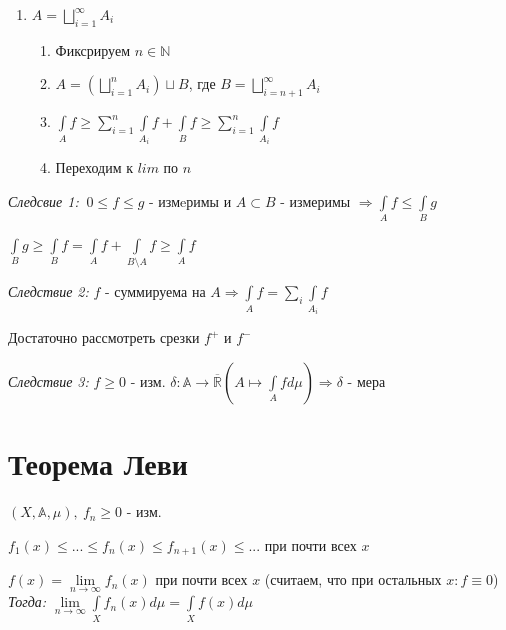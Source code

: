 \documentclass[paper=a4, fontsize=17pt]{article}
\begin{document}
\begin{enumerate}
\begin{enumerate}
	\item $A = \bigsqcup\limits_{i = 1}^{\infty}A_{i}$
		\begin{enumerate}
			\item Фиксрируем $n \in \mathbb{N}$

			\item $A = (\bigsqcup\limits_{i=1}^{n}A_{i}) \sqcup B$, где $B = \bigsqcup\limits_{i=n+1}^{\infty}A_{i}$

			\item $\int\limits_{A}f \geqslant \sum\limits_{i=1}^{n} \int\limits_{A_i}f + \int\limits_{B}f \geqslant \sum\limits_{i=1}^{n} \int\limits_{A_i}f$

			\item Переходим к $lim$ по $n$
		\end{enumerate}

	\end{enumerate}

\end{enumerate}

\emph{Следсвие 1:}
$\ 0 \leqslant f \leqslant g$ - измeримы и  $A \subset B$ - измеримы $\Rightarrow \int\limits_{A}f \leqslant \int\limits_{B}g$

$\int\limits_{B}g \geqslant \int\limits_{B}f = \int\limits_{A}f + \int\limits_{B \setminus A}f \geqslant \int\limits_{A}f$

\bigskip

\emph{Следствие 2:}
$f$ - суммируема на $A \Rightarrow \int\limits_{A}f = \sum\limits_{i} \int\limits_{A_{i}}f$

Достаточно рассмотреть срезки $f^+$ и $f^-$

\bigskip

\emph{Следствие 3:}
$f \geqslant 0$ - изм. $\delta: \mathbb{A} \rightarrow \mathbb{\overline{R}}(A\longmapsto \int\limits_{A}fd\mu) \Rightarrow \delta$ - мера

\section{Теорема Леви}
$(X,\mathds{A},\mu),\ f_n \geqslant 0$ - изм.

$f_1(x) \leqslant ...\leqslant f_n(x) \leqslant f_{n+1}(x) \leqslant ...$ при почти всех $x$

$f(x) = \lim\limits_{n \rightarrow \infty}f_n(x)$ при почти всех $x$ (считаем, что при остальных $x: f \equiv 0$)
\\

\emph{Тогда:} $\lim\limits_{n \rightarrow \infty} \int\limits_{X}f_n(x)d\mu = \int\limits_{X}f(x)d\mu$
\\
\end{document}
